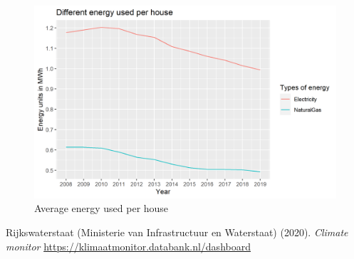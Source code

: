 \documentclass[a4paper,11pt]{article}
\begin{document}
\begin{figure}
    \centering
    \includegraphics[width= \textwidth]{Different energy used per house.png}
    \caption{Average energy used per house}
    \label{fig:my_label2}
\end{figure}


\begin{thebibliography}{}
Rijkswaterstaat (Ministerie van Infrastructuur en Waterstaat) (2020). \textit{Climate monitor}
\url{https://klimaatmonitor.databank.nl/dashboard}

\end{thebibliography}
\end{document}
